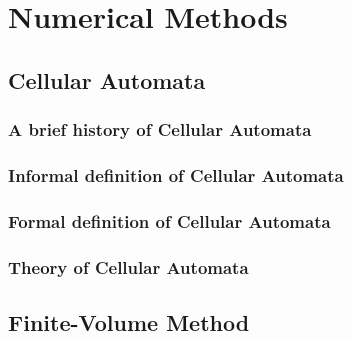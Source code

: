 \chapter{Numerical Methods}

\section{Cellular Automata}


\subsection{A brief history of Cellular Automata}


\subsection{Informal definition of Cellular Automata}


\subsection{Formal definition of Cellular Automata}

\subsection{Theory of Cellular Automata}

\section{Finite-Volume Method}
